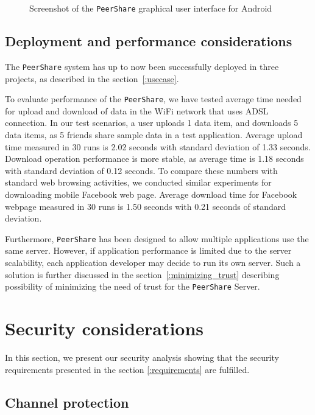 \documentclass[twocolumn,a4paper,10pt]{article}
\newcommand{\peershare}{\texttt{PeerShare}\xspace}
\begin{document}
\begin{figure}[hb!]
	\centering
    	\caption{Screenshot of the \peershare graphical user interface for Android}
	\label{implementation_screenshot}
\end{figure}

\subsection{Deployment and performance considerations}

The \peershare system has up to now been successfully deployed in three projects, as described in the section~\ref{:usecase}.

To evaluate performance of the \peershare, we have tested average time needed for upload and download of data in the WiFi network that uses ADSL connection. In our test scenarios, a user uploads 1 data item, and downloads 5 data items, as 5 friends share sample data in a test application. Average upload time measured in 30 runs is 2.02 seconds with standard deviation of 1.33 seconds. Download operation performance is more stable, as average time is 1.18 seconds with standard deviation of 0.12 seconds. To compare these numbers with standard web browsing activities, we conducted similar experiments for downloading mobile Facebook web page. Average download time for Facebook webpage measured in 30 runs is 1.50 seconds with 0.21 seconds of standard deviation.

Furthermore, \peershare has been designed to allow multiple applications use the same server. However, if application performance is limited due to the server scalability, each application developer may decide to run its own server. Such a solution is further discussed in the section~\ref{:minimizing_trust} describing possibility of minimizing the need of trust for the \peershare Server. 

\section{Security considerations}
\label{:validation}
In this section, we present our security analysis showing that the security requirements presented in the section \ref{:requirements} are fulfilled.

\subsection{Channel protection}
\end{document}
